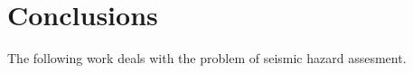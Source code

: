 
\chapter{Conclusions} %

\label{Chapter4} %

The following  work deals with the problem of seismic hazard assesment.
